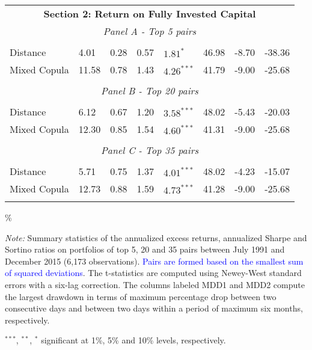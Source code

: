 \documentclass[a4paper]{article}
\begin{document}
\begin{threeparttable}[H]
\begin{tabularx}{\textwidth}{@{\extracolsep{\fill}}llllllll@{}}
		\midrule
		\multicolumn{8}{c}{\textbf{Section 2: Return on Fully Invested Capital}} \\
		\multicolumn{8}{c}{\textit{Panel A - Top 5 pairs}} \\
		&       &       &       &       &       &       &  \\
		Distance & 4.01  & 0.28  & 0.57  & $1.81^{*}$  & 46.98 & -8.70    & -38.36  \\
		Mixed Copula & 11.58  & 0.78  & 1.43  & $4.26^{***}$  & 41.79 & -9.00  & -25.68 \\
		\multicolumn{1}{r}{} & \multicolumn{1}{r}{} & \multicolumn{1}{r}{} & \multicolumn{1}{r}{} & \multicolumn{1}{r}{} & \multicolumn{1}{r}{} & \multicolumn{1}{r}{} & \multicolumn{1}{r}{} \\
		\multicolumn{8}{c}{\textit{Panel B - Top 20 pairs}} \\
		&       &       &       &       &       &       &  \\
		Distance & 6.12  & 0.67  & 1.20  & $3.58^{***}$  & 48.02 & -5.43  & -20.03 \\
		Mixed Copula  & 12.30  & 0.85  & 1.54  & $4.60^{***}$  & 41.31 & -9.00  & -25.68  \\
		\multicolumn{1}{r}{} & \multicolumn{1}{r}{} & \multicolumn{1}{r}{} & \multicolumn{1}{r}{} & \multicolumn{1}{r}{} & \multicolumn{1}{r}{} & \multicolumn{1}{r}{} & \multicolumn{1}{r}{} \\
		\multicolumn{8}{c}{\textit{Panel C - Top 35 pairs}} \\
		&       &       &       &       &       &       &  \\
		Distance & 5.71  & 0.75  & 1.37  & $4.01^{***}$  & 48.02 & -4.23  & -15.07 \\
		Mixed Copula & 12.73  & 0.88  & 1.59  & $4.73^{***}$  & 41.28 & -9.00  & -25.68  \\
		\multicolumn{1}{r}{} & \multicolumn{1}{r}{} & \multicolumn{1}{r}{} & \multicolumn{1}{r}{} & \multicolumn{1}{r}{} & \multicolumn{1}{r}{} & \multicolumn{1}{r}{} & \multicolumn{1}{r}{} \\
		\bottomrule
	\end{tabularx}\%
	\begin{tablenotes}
		\item \textit{Note:} \scriptsize \tiny Summary statistics of the annualized excess returns, annualized Sharpe and Sortino ratios on portfolios of top 5, 20 and 35 pairs between July 1991 and December 2015 (6,173 observations). \textcolor{blue} {Pairs are formed based on the smallest sum of squared deviations}. The t-statistics are computed using Newey-West standard errors with a six-lag correction. The columns labeled MDD1 and MDD2 compute the largest drawdown in terms of maximum percentage drop between two consecutive days and between two days within a period of maximum six months, respectively.
		\item \scriptsize $^{\ast\ast\ast}$, $^{\ast\ast}$, $^{\ast}$  significant at 1\%, 5\% and 10\% levels, respectively.
	\end{tablenotes}
	\label{tab:table101}
\end{threeparttable}
\end{document}
